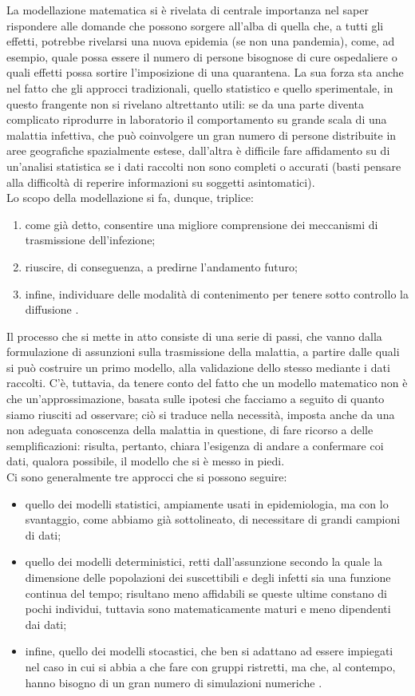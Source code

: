 La modellazione matematica si è rivelata di centrale importanza nel saper rispondere alle domande che possono sorgere all'alba di quella che, a tutti gli effetti, potrebbe rivelarsi una nuova epidemia (se non una pandemia), come, ad esempio, quale possa essere il numero di persone bisognose di cure ospedaliere o quali effetti possa sortire l'imposizione di una quarantena. La sua forza sta anche nel fatto che gli approcci tradizionali, quello statistico e quello sperimentale, in questo frangente non si rivelano altrettanto utili: se da una parte diventa complicato riprodurre in laboratorio il comportamento su grande scala di una malattia infettiva, che può coinvolgere un gran numero di persone distribuite in aree geografiche spazialmente estese, dall'altra è difficile fare affidamento su di un'analisi statistica se i dati raccolti non sono completi o accurati (basti pensare alla difficoltà di reperire informazioni su soggetti asintomatici). \\ Lo scopo della modellazione si fa, dunque, triplice:
\begin{enumerate}
\item come già detto, consentire una migliore comprensione dei meccanismi di trasmissione dell'infezione;
\item riuscire, di conseguenza, a predirne l'andamento futuro;
\item infine, individuare delle modalità di contenimento per tenere sotto controllo la diffusione \cite{Daley}.
\end{enumerate}
Il processo che si mette in atto consiste di una serie di passi, che vanno dalla formulazione di assunzioni sulla trasmissione della malattia, a partire dalle quali si può costruire un primo modello, alla validazione dello stesso mediante i dati raccolti. C'è, tuttavia, da tenere conto del fatto che un modello matematico non è che un'approssimazione, basata sulle ipotesi che facciamo a seguito di quanto siamo riusciti ad osservare; ciò si traduce nella necessità, imposta anche da una non adeguata conoscenza della malattia in questione, di fare ricorso a delle semplificazioni: risulta, pertanto, chiara l'esigenza di andare a confermare coi dati, qualora possibile, il modello che si è messo in piedi. \\ Ci sono generalmente tre approcci che si possono seguire:
\begin{itemize}
\item quello dei modelli statistici, ampiamente usati in epidemiologia, ma con lo svantaggio, come abbiamo già sottolineato, di necessitare di grandi campioni di dati;
\item quello dei modelli deterministici, retti dall'assunzione secondo la quale la dimensione delle popolazioni dei suscettibili e degli infetti sia una funzione continua del tempo; risultano meno affidabili se queste ultime constano di pochi individui, tuttavia sono matematicamente maturi e meno dipendenti dai dati;
\item infine, quello dei modelli stocastici, che ben si adattano ad essere impiegati nel caso in cui si abbia a che fare con gruppi ristretti, ma che, al contempo, hanno bisogno di un gran numero di simulazioni numeriche \cite{Li}.  
\end{itemize}

